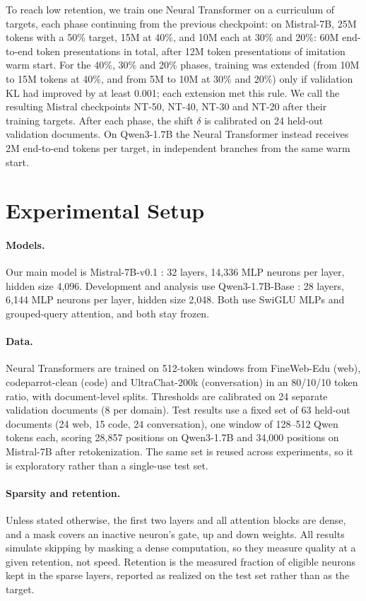 \documentclass[10pt,twocolumn,letterpaper]{article}
\begin{document}
To reach low retention, we train one Neural Transformer on a curriculum of targets, each phase continuing from the previous checkpoint: on Mistral-7B, 25M tokens with a 50\% target, 15M at 40\%, and 10M each at 30\% and 20\%: 60M end-to-end token presentations in total, after 12M token presentations of imitation warm start. For the 40\%, 30\% and 20\% phases, training was extended (from 10M to 15M tokens at 40\%, and from 5M to 10M at 30\% and 20\%) only if validation KL had improved by at least 0.001; each extension met this rule. We call the resulting Mistral checkpoints NT-50, NT-40, NT-30 and NT-20 after their training targets. After each phase, the shift $\delta$ is calibrated on 24 held-out validation documents. On Qwen3-1.7B the Neural Transformer instead receives 2M end-to-end tokens per target, in independent branches from the same warm start.

\section{Experimental Setup}

\paragraph{Models.} Our main model is Mistral-7B-v0.1 \citep{jiang2023mistral}: 32 layers, 14,336 MLP neurons per layer, hidden size 4,096. Development and analysis use Qwen3-1.7B-Base \citep{yang2025qwen3}: 28 layers, 6,144 MLP neurons per layer, hidden size 2,048. Both use SwiGLU MLPs and grouped-query attention, and both stay frozen.

\paragraph{Data.} Neural Transformers are trained on 512-token windows from FineWeb-Edu (web), codeparrot-clean (code) and UltraChat-200k (conversation) in an 80/10/10 token ratio, with document-level splits. Thresholds are calibrated on 24 separate validation documents (8 per domain). Test results use a fixed set of 63 held-out documents (24 web, 15 code, 24 conversation), one window of 128--512 Qwen tokens each, scoring 28,857 positions on Qwen3-1.7B and 34,000 positions on Mistral-7B after retokenization. The same set is reused across experiments, so it is exploratory rather than a single-use test set.

\paragraph{Sparsity and retention.} Unless stated otherwise, the first two layers and all attention blocks are dense, and a mask covers an inactive neuron's gate, up and down weights. All results simulate skipping by masking a dense computation, so they measure quality at a given retention, not speed. Retention is the measured fraction of eligible neurons kept in the sparse layers, reported as realized on the test set rather than as the target.
\end{document}
